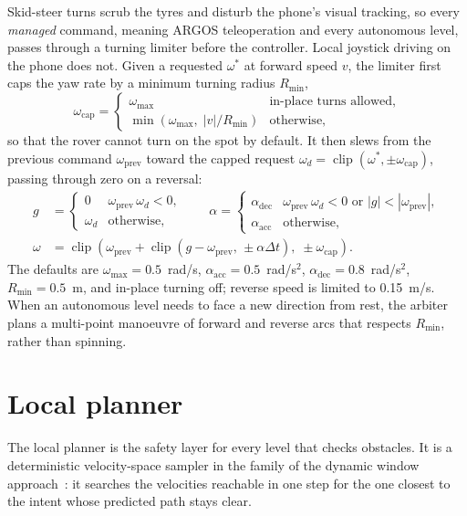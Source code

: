 Skid-steer turns scrub the tyres and disturb the phone's visual tracking, so every \emph{managed} command, meaning ARGOS teleoperation and every autonomous level, passes through a turning limiter before the controller.
Local joystick driving on the phone does not.
Given a requested $\omega^\ast$ at forward speed $v$, the limiter first caps the yaw rate by a minimum turning radius $R_{\min}$,
\begin{equation}
  \omega_{\text{cap}} = \begin{cases} \omega_{\max} & \text{in-place turns allowed,} \\ \min(\omega_{\max},\; |v| / R_{\min}) & \text{otherwise,} \end{cases}
\end{equation}
so that the rover cannot turn on the spot by default.
It then slews from the previous command $\omega_{\text{prev}}$ toward the capped request $\omega_d = \operatorname{clip}(\omega^\ast, \pm\omega_{\text{cap}})$, passing through zero on a reversal:
\begin{align}
  g &= \begin{cases} 0 & \omega_{\text{prev}}\,\omega_d < 0, \\ \omega_d & \text{otherwise,} \end{cases} \qquad
  \alpha = \begin{cases} \alpha_{\text{dec}} & \omega_{\text{prev}}\,\omega_d < 0 \text{ or } |g| < |\omega_{\text{prev}}|, \\ \alpha_{\text{acc}} & \text{otherwise,} \end{cases} \\
  \omega &= \operatorname{clip}\!\left(\omega_{\text{prev}} + \operatorname{clip}(g - \omega_{\text{prev}},\, \pm\alpha\Delta t),\; \pm\omega_{\text{cap}}\right).
\end{align}
The defaults are $\omega_{\max} = 0.5$~rad/s, $\alpha_{\text{acc}} = 0.5$~rad/s$^2$, $\alpha_{\text{dec}} = 0.8$~rad/s$^2$, $R_{\min} = 0.5$~m, and in-place turning off; reverse speed is limited to 0.15~m/s.
When an autonomous level needs to face a new direction from rest, the arbiter plans a multi-point manoeuvre of forward and reverse arcs that respects $R_{\min}$, rather than spinning.

\section{Local planner}
\label{sec:auto-planner}

The local planner is the safety layer for every level that checks obstacles.
It is a deterministic velocity-space sampler in the family of the dynamic window approach~\citep{fox1997dwa}: it searches the velocities reachable in one step for the one closest to the intent whose predicted path stays clear.

